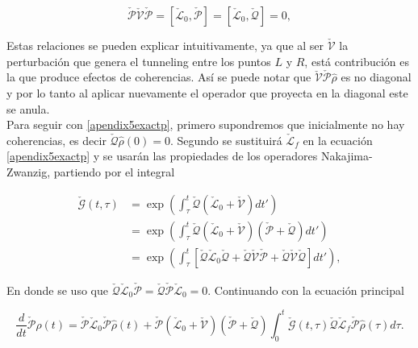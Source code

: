 \begin{appendixs}
\begin{equation*}
    \check{\mathcal{P}}\check{\mathcal{V}}\check{\mathcal{P}} = [\check{\mathcal{L}}_0,\check{\mathcal{P}}] = [\check{\mathcal{L}}_0,\check{\mathcal{Q}}] = 0, 
\end{equation*}

Estas relaciones se pueden explicar intuitivamente, ya que al ser $\check{\mathcal{V}}$ la perturbación que genera el tunneling entre los puntos $L$ y $R$, está contribución es la que produce efectos de coherencias. Así se puede notar que $\check{\mathcal{V}}\check{\mathcal{P}}\hat{\rho}$ es no diagonal y por lo tanto al aplicar nuevamente el operador que proyecta en la diagonal este se anula.
\\
Para seguir con \ref{apendix5exactp}, primero supondremos que inicialmente no hay coherencias, es decir $\check{\mathcal{Q}}\hat{\rho}(0) = 0$. Segundo se sustituirá $\check{\mathcal{L}}_{f}$ en la ecuación \ref{apendix5exactp} y se usarán las propiedades de los operadores Nakajima-Zwanzig, partiendo por el integral

\begin{align*}
    \check{\mathcal{G}}(t,\tau) & = \exp\left(  \int_{\tau}^{t}\check{\mathcal{Q}}(\check{\mathcal{L}}_{0} + \check{\mathcal{V}})dt' \right) \\
        & = \exp\left(  \int_{\tau}^{t}\check{\mathcal{Q}}(\check{\mathcal{L}}_{0}+\check{\mathcal{V}})(\check{\mathcal{P}}+\check{\mathcal{Q}}) dt' \right) \\
            & = \exp\left(  \int_{\tau}^{t}\left[\check{\mathcal{Q}}\check{\mathcal{L}}_{0}\check{\mathcal{Q}}+ \check{\mathcal{Q}}\check{\mathcal{V}}\check{\mathcal{P}}+\check{\mathcal{Q}}\check{\mathcal{V}}\check{\mathcal{Q}}\right] dt' \right),       
\end{align*}

En donde se uso que $\check{\mathcal{Q}}\check{\mathcal{L}}_{0}\check{\mathcal{P}} = \check{\mathcal{Q}}\check{\mathcal{P}}\check{\mathcal{L}}_{0}=0$. Continuando con la ecuación principal

\begin{equation*}
    \frac{d}{dt}\check{\mathcal{P}}\hat{\rho}(t) = \check{\mathcal{P}}\check{\mathcal{L}}_{0}\check{\mathcal{P}}\hat{\rho}(t) + \check{\mathcal{P}}(\check{\mathcal{L}}_{0} + \check{\mathcal{V}})(\check{\mathcal{P}}+\check{\mathcal{Q}})\int_{0}^{t}\check{\mathcal{G}}(t,\tau)\check{\mathcal{Q}}\check{\mathcal{L}}_{f} \check{\mathcal{P}}\hat{\rho}(\tau)d\tau.       
\end{equation*}


\end{appendixs}
